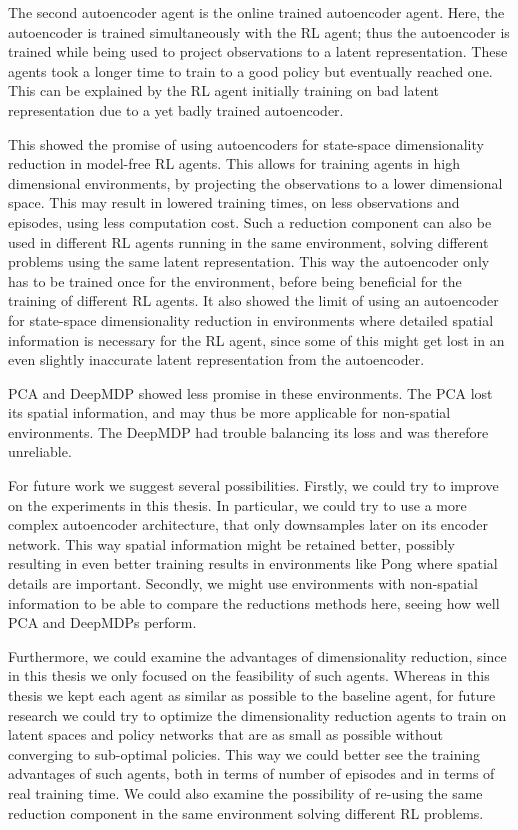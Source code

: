 The second autoencoder agent is the online trained autoencoder agent. Here, the autoencoder is trained simultaneously with the RL agent; thus the autoencoder is trained while being used to project observations to a latent representation. These agents took a longer time to train to a good policy but eventually reached one. This can be explained by the RL agent initially training on bad latent representation due to a yet badly trained autoencoder.

This showed the promise of using autoencoders for state-space dimensionality reduction in model-free RL agents. This allows for training agents in high dimensional environments, by projecting the observations to a lower dimensional space. This may result in lowered training times, on less observations and episodes, using less computation cost. Such a reduction component can also be used in different RL agents running in the same environment, solving different problems using the same latent representation. This way the autoencoder only has to be trained once for the environment, before being beneficial for the training of different RL agents. It also showed the limit of using an autoencoder for state-space dimensionality reduction in environments where detailed spatial information is necessary for the RL agent, since some of this might get lost in an even slightly inaccurate latent representation from the autoencoder.

PCA and DeepMDP showed less promise in these environments. The PCA lost its spatial information, and may thus be more applicable for non-spatial environments. The DeepMDP had trouble balancing its loss and was therefore unreliable.

For future work we suggest several possibilities. Firstly, we could try to improve on the experiments in this thesis. In particular, we could try to use a more complex autoencoder architecture, that only downsamples later on its encoder network. This way spatial information might be retained better, possibly resulting in even better training results in environments like Pong where spatial details are important. Secondly, we might use environments with non-spatial information to be able to compare the reductions methods here, seeing how well PCA and DeepMDPs perform. 

Furthermore, we could examine the advantages of dimensionality reduction, since in this thesis we only focused on the feasibility of such agents. Whereas in this thesis we kept each agent as similar as possible to the baseline agent, for future research we could try to optimize the dimensionality reduction agents to train on latent spaces and policy networks that are as small as possible without converging to sub-optimal policies. This way we could better see the training advantages of such agents, both in terms of number of episodes and in terms of real training time. We could also examine the possibility of re-using the same reduction component in the same environment solving different RL problems.